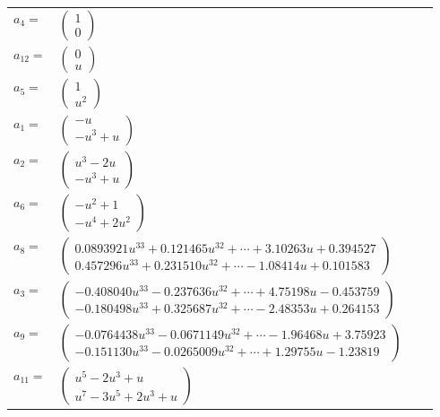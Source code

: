 \documentclass[1p]{elsarticle_modified}
\theoremstyle{definition}
\begin{document}
\begin{tabular}{m{7pt} m{180pt} m{7pt} m{180pt} }
\flushright $a_{4}=$&$\begin{pmatrix}1\\0\end{pmatrix}$ \\
\flushright $a_{12}=$&$\begin{pmatrix}0\\u\end{pmatrix}$ \\
\flushright $a_{5}=$&$\begin{pmatrix}1\\u^2\end{pmatrix}$ \\
\flushright $a_{1}=$&$\begin{pmatrix}- u\\- u^3+u\end{pmatrix}$ \\
\flushright $a_{2}=$&$\begin{pmatrix}u^3-2 u\\- u^3+u\end{pmatrix}$ \\
\flushright $a_{6}=$&$\begin{pmatrix}- u^2+1\\- u^4+2 u^2\end{pmatrix}$ \\
\flushright $a_{8}=$&$\begin{pmatrix}0.0893921 u^{33}+0.121465 u^{32}+\cdots+3.10263 u+0.394527\\0.457296 u^{33}+0.231510 u^{32}+\cdots-1.08414 u+0.101583\end{pmatrix}$ \\
\flushright $a_{3}=$&$\begin{pmatrix}-0.408040 u^{33}-0.237636 u^{32}+\cdots+4.75198 u-0.453759\\-0.180498 u^{33}+0.325687 u^{32}+\cdots-2.48353 u+0.264153\end{pmatrix}$ \\
\flushright $a_{9}=$&$\begin{pmatrix}-0.0764438 u^{33}-0.0671149 u^{32}+\cdots-1.96468 u+3.75923\\-0.151130 u^{33}-0.0265009 u^{32}+\cdots+1.29755 u-1.23819\end{pmatrix}$ \\
\flushright $a_{11}=$&$\begin{pmatrix}u^5-2 u^3+u\\u^7-3 u^5+2 u^3+u\end{pmatrix}$ \\

\end{tabular}
\end{document}
